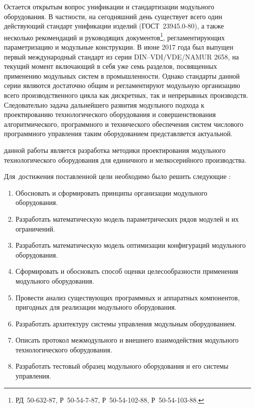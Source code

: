 Остается открытым вопрос унификации и стандартизации модульного оборудования. В частности, на сегодняшний день существует всего один действующий стандарт унификации изделий (ГОСТ~23945.0-80), а также несколько рекомендаций и руководящих документов\footnote{РД~50-632-87, Р~50-54-7-87, Р~50-54-102-88, Р~50-54-103-88.}, регламентирующих параметризацию и модульные конструкции. В июне 2017 года был выпущен первый международный стандарт из серии DIN--VDI/VDE/NAMUR 2658, на текущий момент включающий в себя уже семь разделов, посвященных применению модульных систем в промышленности. Однако стандарты данной серии являются достаточно общим и регламентируют модульную организацию всего производственного цикла как дискретных, так и непрерывных производств. Следовательно задача дальнейшего развития модульного подхода к проектированию технологического оборудования и совершенствования алгоритмического, программного и технического обеспечения систем числового программного управления таким оборудованием представляется актуальной.  


{\aim} данной работы является разработка методики проектирования модульного технологического оборудования для единичного и мелкосерийного производства.

Для~достижения поставленной цели необходимо было решить следующие {\tasks}:
\begin{enumerate}[beginpenalty=10000] %
  \item Обосновать и сформировать принципы организации модульного оборудования.
  \item Разработать математическую модель параметрических рядов модулей и их ограничений.
  \item Разработать математическую модель оптимизации конфигураций модульного оборудования.
  \item Сформировать и обосновать способ оценки целесообразности применения модульного оборудования.
  \item Провести анализ существующих программных и аппаратных компонентов, пригодных для реализации модульного оборудования.
  \item Разработать архитектуру системы управления модульным оборудованием.
  \item Описать протокол межмодульного и внешнего взаимодействия модульного технологического оборудования.
  \item Разработать тестовый образец модульного оборудования и его системы управления.
\end{enumerate}


